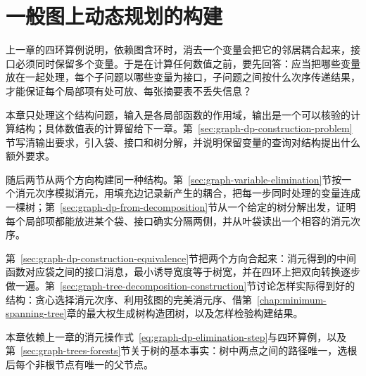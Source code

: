 \chapter{一般图上动态规划的构建}
\label{chap:general-graph-dp-construction}

上一章的四环算例说明，依赖图含环时，消去一个变量会把它的邻居耦合起来，接口必须同时保留多个变量。于是在计算任何数值之前，要先回答：应当把哪些变量放在一起处理，每个子问题以哪些变量为接口，子问题之间按什么次序传递结果，才能保证每个局部项有处可放、每张摘要表不丢失信息？

本章只处理这个结构问题，输入是各局部函数的作用域，输出是一个可以核验的计算结构；具体数值表的计算留给下一章。第~\ref{sec:graph-dp-construction-problem}节写清输出要求，引入袋、接口和树分解，并说明保留变量的查询对结构提出什么额外要求。

随后两节从两个方向构建同一种结构。第~\ref{sec:graph-variable-elimination}节按一个消元次序模拟消元，用填充边记录新产生的耦合，把每一步同时处理的变量连成一棵树；第~\ref{sec:graph-dp-from-decomposition}节从一个给定的树分解出发，证明每个局部项都能放进某个袋、接口确实分隔两侧，并从叶袋读出一个相容的消元次序。

第~\ref{sec:graph-dp-construction-equivalence}节把两个方向合起来：消元得到的中间函数对应袋之间的接口消息，最小诱导宽度等于树宽，并在四环上把双向转换逐步做一遍。第~\ref{sec:graph-tree-decomposition-construction}节讨论怎样实际得到好的结构：贪心选择消元次序、利用弦图的完美消元序、借第~\ref{chap:minimum-spanning-tree}章的最大权生成树构造团树，以及怎样检验构建结果。

本章依赖上一章的消元操作式~\eqref{eq:graph-dp-elimination-step}与四环算例，以及第~\ref{sec:graph-trees-forests}节关于树的基本事实：树中两点之间的路径唯一，选根后每个非根节点有唯一的父节点。







